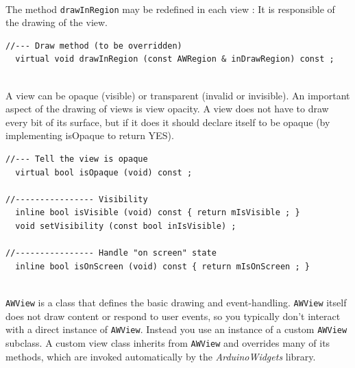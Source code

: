 \documentclass[a4paper,11pt]{extarticle}
\begin{document}
~\\ The method \texttt{drawInRegion} may be redefined in each view : It is responsible of the drawing of the view.

\begin{lstlisting}[language=Arduinonl]
//--- Draw method (to be overridden)
  virtual void drawInRegion (const AWRegion & inDrawRegion) const ;
\end{lstlisting}

~\\ A view can be opaque (visible) or transparent (invalid or invisible). An important aspect of the drawing of views is view opacity. A view does not have to draw every bit of its surface, but if it does it should declare itself to be opaque (by implementing isOpaque to return YES).

\begin{lstlisting}[language=Arduinonl]
//--- Tell the view is opaque
  virtual bool isOpaque (void) const ;

//---------------- Visibility
  inline bool isVisible (void) const { return mIsVisible ; }
  void setVisibility (const bool inIsVisible) ;

//---------------- Handle "on screen" state
  inline bool isOnScreen (void) const { return mIsOnScreen ; }
\end{lstlisting}


~\\ \texttt{AWView} is a class that defines the basic drawing and event-handling. \texttt{AWView} itself does not draw content or respond to user events, so you typically don’t interact with a direct instance of \texttt{AWView}. Instead you use an instance of a custom \texttt{AWView} subclass. A custom view class inherits from \texttt{AWView} and overrides many of its methods, which are invoked automatically by the \emph{ArduinoWidgets} library.
\end{document}
